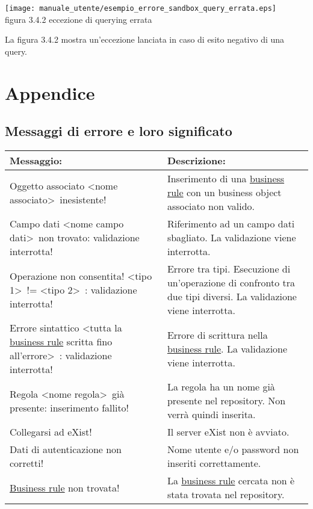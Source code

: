 \begin{center}
\texttt{[image: manuale\_utente/esempio\_errore\_sandbox\_query\_errata.eps]}\\
figura 3.4.2 eccezione di querying errata
\end{center}
La figura 3.4.2 mostra un'eccezione lanciata in caso di esito negativo di una query.

\chapter{Appendice}
\section{Messaggi di errore e loro significato}
\begin{table}[htbp]
\begin{tabular}{||p{6.5cm}||p{6.5cm}||}
\hline
\textbf{Messaggio:} & \textbf{Descrizione:} \\ \hline
Oggetto associato \textless nome associato\textgreater\ inesistente! & Inserimento di una \underline{business rule} con un business object associato non valido. \\ \hline
Campo dati \textless nome campo dati\textgreater\ non trovato: validazione interrotta! & Riferimento ad un campo dati sbagliato. La validazione viene interrotta. \\ \hline
Operazione non consentita! \textless tipo 1\textgreater\ != \textless tipo 2\textgreater\ : validazione interrotta! & Errore tra tipi. Esecuzione di un'operazione di confronto tra due tipi diversi. La validazione viene interrotta. \\ \hline
Errore sintattico \textless tutta la \underline{business rule} scritta fino all'errore\textgreater\ : validazione interrotta! & Errore di scrittura nella \underline{business rule}. La validazione viene interrotta. \\ \hline
Regola \textless nome regola\textgreater\  gi\`a presente: inserimento fallito! & La regola ha un nome gi\`a presente nel repository. Non verr\`a quindi inserita. \\ \hline
Collegarsi ad eXist! & Il server eXist non \`e avviato. \\ \hline
Dati di autenticazione non corretti! & Nome utente e/o password non inseriti correttamente. \\ \hline
\underline{Business rule} non trovata! & La \underline{business rule} cercata non \`e stata trovata nel repository. \\ \hline
\end{tabular} \\
\end{table}



